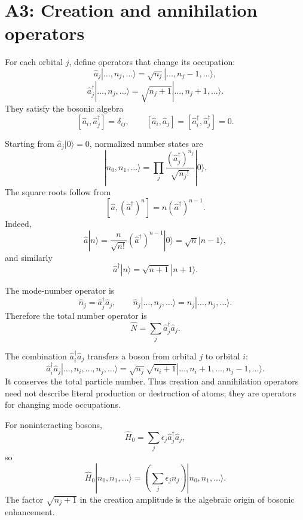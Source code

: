 \section{A3: Creation and annihilation operators}

For each orbital $j$, define operators that change its occupation:
\[
\hat a_j|\ldots,n_j,\ldots\rangle
=\sqrt{n_j}|\ldots,n_j-1,\ldots\rangle,
\]
\[
\hat a_j^\dagger|\ldots,n_j,\ldots\rangle
=\sqrt{n_j+1}|\ldots,n_j+1,\ldots\rangle.
\]
They satisfy the bosonic algebra
\[
[\hat a_i,\hat a_j^\dagger]=\delta_{ij},
\qquad
[\hat a_i,\hat a_j]=
[\hat a_i^\dagger,\hat a_j^\dagger]=0.
\]

Starting from $\hat a_j|0\rangle=0$, normalized number states are
\[
\boxed{
|n_0,n_1,\ldots\rangle
=\prod_j\frac{(\hat a_j^\dagger)^{n_j}}{\sqrt{n_j!}}|0\rangle.
}
\]
The square roots follow from
\[
[\hat a,(\hat a^\dagger)^n]=n(\hat a^\dagger)^{n-1}.
\]
Indeed,
\[
\hat a|n\rangle
=\frac{n}{\sqrt{n!}}(\hat a^\dagger)^{n-1}|0\rangle
=\sqrt n|n-1\rangle,
\]
and similarly
\[
\hat a^\dagger|n\rangle=\sqrt{n+1}|n+1\rangle.
\]

The mode-number operator is
\[
\hat n_j=\hat a_j^\dagger\hat a_j,
\qquad
\hat n_j|\ldots,n_j,\ldots\rangle
=n_j|\ldots,n_j,\ldots\rangle.
\]
Therefore the total number operator is
\[
\boxed{\hat N=\sum_j\hat a_j^\dagger\hat a_j.}
\]

The combination $\hat a_i^\dagger\hat a_j$ transfers a boson from orbital
$j$ to orbital $i$:
\[
\hat a_i^\dagger\hat a_j
|\ldots,n_i,\ldots,n_j,\ldots\rangle
=\sqrt{n_j}\sqrt{n_i+1}
|\ldots,n_i+1,\ldots,n_j-1,\ldots\rangle.
\]
It conserves the total particle number. Thus creation and annihilation
operators need not describe literal production or destruction of atoms; they
are operators for changing mode occupations.

For noninteracting bosons,
\[
\hat H_0=\sum_j\epsilon_j\hat a_j^\dagger\hat a_j,
\]
so
\[
\hat H_0|n_0,n_1,\ldots\rangle
=\left(\sum_j\epsilon_jn_j\right)|n_0,n_1,\ldots\rangle.
\]
The factor $\sqrt{n_j+1}$ in the creation amplitude is the algebraic origin of
bosonic enhancement.
